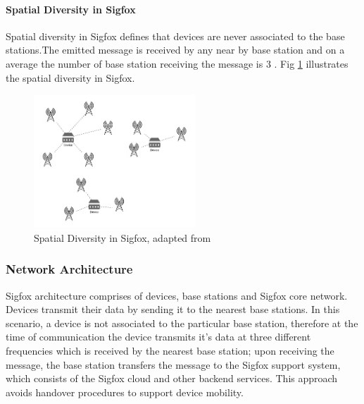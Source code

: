 \documentclass[12pt]{article}
\begin{document}
\paragraph{Spatial Diversity in Sigfox}
Spatial diversity in Sigfox defines that devices are never associated to the base stations.The emitted message is received by any near by base station and on a average the number of base station receiving the message is 3 \cite{SigfoxTechnicalDoc}. Fig \ref{fig:Spatial Diversity in Sigfox} illustrates the spatial diversity in Sigfox.

\begin{figure}[H]
  \includegraphics[width=0.5 \columnwidth, height=5cm,keepaspectratio]{Images/spatial_diversity.pdf}
  \centering
  \caption{Spatial Diversity in Sigfox, adapted from \cite{SigfoxTechnicalDoc}}
  \label{fig:Spatial Diversity in Sigfox}
\end{figure}


\subsubsection{Network Architecture}\label{Network Architecture}

Sigfox architecture comprises of devices, base stations and Sigfox core network. Devices transmit their data by sending it to the nearest base stations. In this scenario, a device is not associated to the particular base station, therefore at the time of communication the device transmits it's data at three different frequencies which is received by the nearest base station; upon receiving the message, the base station transfers the message to the Sigfox support system, which consists of the Sigfox cloud and other backend services. This approach avoids handover procedures to support device mobility.
\end{document}
